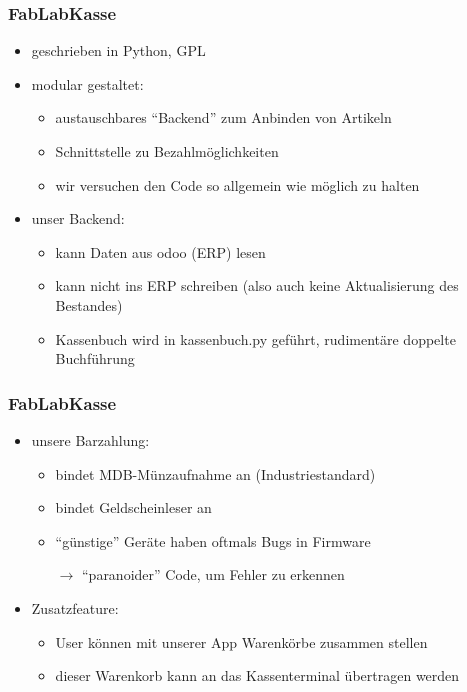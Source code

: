 \documentclass[german]{beamer} %
\begin{document}
\begin{frame}
\frametitle{FabLabKasse}
 \begin{itemize}
  \item geschrieben in Python, GPL
  \item modular gestaltet:
    \begin{itemize}
     \item austauschbares \enquote{Backend} zum Anbinden von Artikeln
     \item Schnittstelle zu Bezahlmöglichkeiten
     \item wir versuchen den Code so allgemein wie möglich zu halten
    \end{itemize}
  \item unser Backend:
    \begin{itemize}
      \item kann Daten aus odoo (ERP) lesen
      \item kann nicht ins ERP schreiben (also auch keine Aktualisierung des Bestandes)
      \item Kassenbuch wird in kassenbuch.py geführt, rudimentäre doppelte Buchführung
    \end{itemize}
  \end{itemize}
\end{frame}
\begin{frame}
\frametitle{FabLabKasse}
  \begin{itemize}
  \item unsere Barzahlung:
     \begin{itemize}
        \item bindet MDB-Münzaufnahme an (Industriestandard)
        \item bindet Geldscheinleser an
        \item \enquote{günstige} Geräte haben oftmals Bugs in Firmware
        \item[$\rightarrow$] \enquote{paranoider} Code, um Fehler zu erkennen
     \end{itemize}
  \item Zusatzfeature:
     \begin{itemize}
       \item User können mit unserer App Warenkörbe zusammen stellen
       \item dieser Warenkorb kann an das Kassenterminal übertragen werden
     \end{itemize} 
 \end{itemize}
\end{frame}
\end{document}
